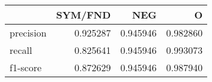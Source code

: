 \begin{tabular}{lrrr}
\toprule
{} &   SYM/FND &       NEG &         O \\
\midrule
precision &  0.925287 &  0.945946 &  0.982860 \\
recall    &  0.825641 &  0.945946 &  0.993073 \\
f1-score  &  0.872629 &  0.945946 &  0.987940 \\
\bottomrule
\end{tabular}
